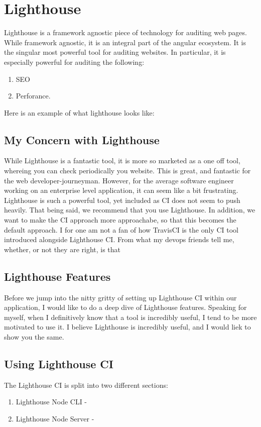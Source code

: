 \chapter{ Lighthouse }    

Lighthouse is a framework agnostic piece of technology for auditing web pages. While framework agnostic, it is an integral part of the angular ecosystem. It is the singular most powerful tool for auditing websites. In particular, it is especially powerful for auditing the following:
\begin{enumerate}
  \item SEO 
  \item Perforance.
\end{enumerate}

Here is an example of what lighthouse looks like: 

\section{My Concern with Lighthouse}
While Lighthouse is a fantastic tool, it is more so marketed as a one off tool, whereing you can check periodically you website. This is great, and fantastic for the web developer-journeyman. However, for the average software engineer working on an enterprise level application, it can seem like a bit frustrating. Lighthouse is such a powerful tool, yet included as CI does not seem to push heavily. That being said, we recommend that you use Lighthouse. In addition, we want to make the CI approach more approachabe, so that this becomes the default approach. I for one am not a fan of how TravisCI is the only CI tool introduced alongside Lighthouse CI. From what my devops friends tell me, whether, or not they are right, is that 

\section{Lighthouse Features}
Before we jump into the nitty gritty of setting up Lighthouse CI within our application, I would like to do a deep dive of Lighthouse features. Speaking for myself, when I definitively know that a tool is incredibly useful, I tend to be more motivated to use it. I believe Lighthouse is incredibly useful, and I would liek to show you the same. 


\section{Using Lighthouse CI}
The Lighthouse CI is split into two different sections: 
\begin{enumerate}
  \item Lighthouse Node CLI - 
  \item Lighthouse Node Server - 
\end{enumerate}


